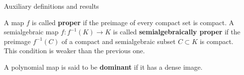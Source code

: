 \documentclass[11pt, a4paper, english, twoside, notitlepage]{report}
\begin{document}
\begin{chapter}{Auxiliary definitions and results}
\begin{definition}\label{properMap}
A map $f$ is called \textbf{proper} if the preimage of every compact set is compact. A semialgebraic map $f: f^{-1}(K) \longrightarrow K$ is called \textbf{semialgebraically proper} if the preimage $f^{-1}(C)$ of a compact and semialgebraic subset $C \subset K$ is compact. This condition is weaker than the previous one.
\end{definition}

\begin{definition}\label{dominant}
A polynomial map is said to be \textbf{dominant} if it has a dense image. 
\end{definition}


\end{chapter}


\begin{thebibliography}{10}


\end{thebibliography}
\end{document}
